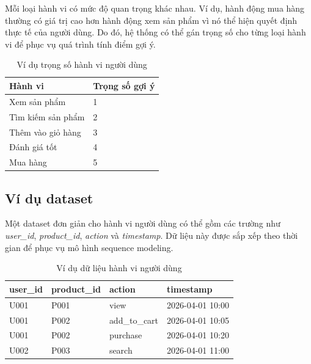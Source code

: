 \documentclass[../main.tex]{subfiles}
\begin{document}
Mỗi loại hành vi có mức độ quan trọng khác nhau. Ví dụ, hành động mua hàng thường có giá trị cao hơn hành động xem sản phẩm vì nó thể hiện quyết định thực tế của người dùng. Do đó, hệ thống có thể gán trọng số cho từng loại hành vi để phục vụ quá trình tính điểm gợi ý.

\begin{table}[H]
    \centering
    \caption{Ví dụ trọng số hành vi người dùng}
    \label{tab:chapter3-behavior-weight}
    \begin{tabular}{|p{}|p{}|}
        \hline
        \rowcolor{primary!35}
        \textbf{Hành vi} & \textbf{Trọng số gợi ý} \\
\hline
Xem sản phẩm & 1 \\
\hline
Tìm kiếm sản phẩm & 2 \\
\hline
Thêm vào giỏ hàng & 3 \\
\hline
Đánh giá tốt & 4 \\
\hline
Mua hàng & 5 \\
\hline
\end{tabular}
\end{table}

\subsection{Ví dụ dataset}

Một dataset đơn giản cho hành vi người dùng có thể gồm các trường như \textit{user\_id}, \textit{product\_id}, \textit{action} và \textit{timestamp}. Dữ liệu này được sắp xếp theo thời gian để phục vụ mô hình sequence modeling.

\begin{table}[H]
    \centering
    \caption{Ví dụ dữ liệu hành vi người dùng}
    \label{tab:chapter3-user-behavior-example}
    \begin{tabular}{|p{}|p{}|p{}|p{}|}
        \hline
        \rowcolor{primary!35}
        \textbf{user\_id} & \textbf{product\_id} & \textbf{action} & \textbf{timestamp} \\
\hline
U001 & P001 & view & 2026-04-01 10:00 \\
\hline
U001 & P002 & add\_to\_cart & 2026-04-01 10:05 \\
\hline
U001 & P002 & purchase & 2026-04-01 10:20 \\
\hline
U002 & P003 & search & 2026-04-01 11:00 \\
\hline
\end{tabular}
\end{table}
\end{document}
